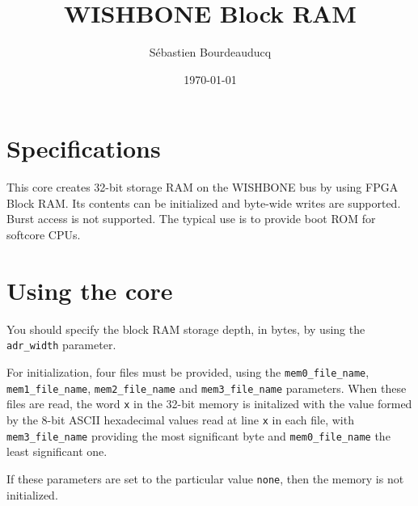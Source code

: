\documentclass[a4paper,11pt]{article}
\title{WISHBONE Block RAM}
\author{S\'ebastien Bourdeauducq}
\date{\today}
\begin{document}
\maketitle{}
\section{Specifications}
This core creates 32-bit storage RAM on the WISHBONE bus by using FPGA Block RAM. Its contents can be initialized and byte-wide writes are supported. Burst access is not supported. The typical use is to provide boot ROM for softcore CPUs.

\section{Using the core}
You should specify the block RAM storage depth, in bytes, by using the \verb!adr_width! parameter.

For initialization, four files must be provided, using the \verb!mem0_file_name!, \verb!mem1_file_name!, \verb!mem2_file_name! and \verb!mem3_file_name! parameters. When these files are read, the word \verb!x! in the 32-bit memory is initalized with the value formed by the 8-bit ASCII hexadecimal values read at line \verb!x! in each file, with \verb!mem3_file_name! providing the most significant byte and \verb!mem0_file_name! the least significant one.

If these parameters are set to the particular value \verb!none!, then the memory is not initialized.
\end{document}

